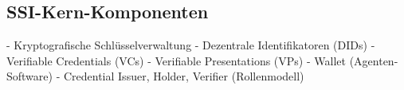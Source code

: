 \subsection{SSI-Kern-Komponenten} \label{sec:SSI-Kern-Komponenten}

- Kryptografische Schlüsselverwaltung
- Dezentrale Identifikatoren (DIDs)
- Verifiable Credentials (VCs)
- Verifiable Presentations (VPs)
- Wallet (Agenten-Software)
- Credential Issuer, Holder, Verifier (Rollenmodell)
